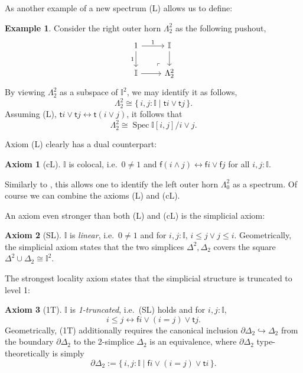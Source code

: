 \documentclass[12pt]{amsart}
\theoremstyle{definition}
\newtheorem{example}[theorem]{Example}
\newtheorem*{axiom}{Axiom}
\newcommand{\mbb}[1]{\mathbb{#1}}
\newcommand{\I}{\mbb I}
\newcommand{\ms}[1]{\mathsf{#1}}
\newcommand{\scomp}[2]{\{\,#1\mid#2\,\}}
\newcommand{\hook}{\hookrightarrow}
\newcommand{\eq}{\leftrightarrow}
\newcommand{\spec}{\operatorname{Spec}}
\begin{document}
As another example of a new spectrum (L) allows us to define:

\begin{example}\label{exm:hornaffine}
  Consider the right outer horn $\Lambda^2_2$ as the following pushout,
  \[
    \begin{tikzcd}
      1 \ar[d, "1"'] \ar[r, "1"] & \I \ar[d] \\
      \I \ar[r] & \Lambda^2_2
      \arrow["\lrcorner"{anchor=center, pos=0.125, rotate=180}, draw=none, from=2-2, to=1-1]
    \end{tikzcd}
  \]
  By viewing $\Lambda^2_2$ as a subspace of $\I^2$, we may identify it as follows,
  \[ \Lambda^2_2 \cong \scomp{i,j : \I}{\ms ti \vee \ms tj}. \]
  Assuming (L), $\ms ti \vee \ms tj \eq \ms t(i\vee j)$, it follows that 
  \[ \Lambda^2_2 \cong \spec \I[i,j]/i \vee j. \]
\end{example}

Axiom (L) clearly has a dual counterpart:

\begin{axiom}[cL]\label{ax:cL}
  $\I$ is colocal, i.e.\ $0 \neq 1$ and $\ms f(i \wedge j) \eq \ms fi \vee \ms fj$ for all $i,j : \I$.
\end{axiom}

Similarly to , this allows one to identify the left outer horn $\Lambda^2_0$ as a spectrum. Of course we can combine the axioms (L) and (cL). 

An axiom even stronger than both (L) and (cL) is the simplicial axiom:

\begin{axiom}[SL]\label{ax:SL}
  $\I$ is \emph{linear}, i.e.\ $0 \neq 1$ and for $i,j : \I$, $i \le j \vee j \le i$. Geometrically, the simplicial axiom states that the two simplices $\Delta^2,\Delta_2$ covers the square $\Delta^2 \cup \Delta_2 \cong \I^2$.
\end{axiom}

The strongest locality axiom states that the simplicial structure is truncated to level 1:

\begin{axiom}[1T]\label{ax:1T}
  $\I$ is \emph{1-truncated}, i.e.\ (SL) holds and for $i,j : \I$, 
  \[ i \le j \eq \ms fi \vee (i = j)\vee \ms tj. \]
  Geometrically, (1T) additionally requires the canonical inclusion $\partial\Delta_2 \hook \Delta_2$ from the boundary $\partial\Delta_2$ to the 2-simplice $\Delta_2$ is an equivalence, where $\partial\Delta_2$ type-theoretically is simply
  \[ \partial\Delta_2 := \scomp{i,j : \I}{\ms fi \vee (i = j) \vee \ms ti}. \]
\end{axiom}
\end{document}
